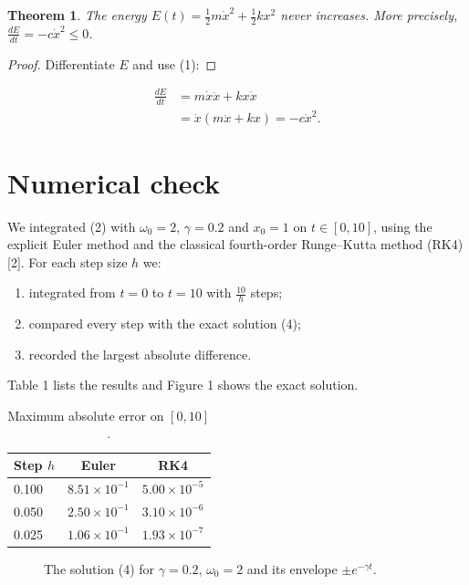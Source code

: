 \documentclass[11pt,a4paper]{article}
\newtheorem{theorem}{Theorem}
\begin{document}
\begin{theorem}
  The energy $E(t)=\frac{1}{2}m\dot{x}^{2}+\frac{1}{2}kx^{2}$ never increases. More precisely, $\frac{dE}{dt}=-c\dot{x}^{2}\leq0$.
\end{theorem}

\begin{proof}
  Differentiate $E$ and use (1):
\end{proof}

\begin{align*}
  \frac{dE}{dt} &=m\dot{x}\ddot{x}+kx\dot{x} \\
   &=\dot{x}(m\ddot{x}+kx)=-c\dot{x}^{2}.
\end{align*}

\section{Numerical check}

We integrated (2) with $\omega_{0}=2$, $\gamma=0.2$ and $x_{0}=1$ on $t\in[0,10]$, using the explicit Euler method and the classical fourth-order Runge--Kutta method (RK4) [2]. For each step size $h$ we:

\begin{enumerate}
  \item integrated from $t=0$ to $t=10$ with $\frac{10}{h}$ steps;
  \item compared every step with the exact solution (4);
  \item recorded the largest absolute difference.
\end{enumerate}

Table 1 lists the results and Figure 1 shows the exact solution.

\begin{table}[htbp]
  \centering
  \caption{Maximum absolute error on $[0,10]$.}
  \begin{tabular}{lcc}
    \toprule
    Step $h$ & Euler & RK4 \\
    \midrule
    0.100 & $8.51\times10^{-1}$ & $5.00\times10^{-5}$ \\
    0.050 & $2.50\times10^{-1}$ & $3.10\times10^{-6}$ \\
    0.025 & $1.06\times10^{-1}$ & $1.93\times10^{-7}$ \\
    \bottomrule
  \end{tabular}
\end{table}

\begin{figure}[htbp]
  \centering
  \caption{The solution (4) for $\gamma=0.2$, $\omega_{0}=2$ and its envelope $\pm e^{-\gamma t}$.}
\end{figure}
\end{document}
